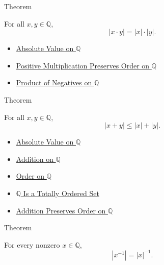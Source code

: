 \begin{theorembox}{Theorem}
\begin{theorem}
\label{thm:absolute-value-multiplicative-on-q}
For all $x,y\in\mathbb{Q}$,
\[
|x\cdot y|=|x|\cdot |y|.
\]
\end{theorem}
\end{theorembox}

\begin{dependencies}
\begin{itemize}
  \item \hyperref[def:absolute-value-on-q]{Absolute Value on $\mathbb{Q}$}
  \item \hyperref[thm:positive-multiplication-preserves-order-on-q]{Positive Multiplication Preserves Order on $\mathbb{Q}$}
  \item \hyperref[cor:product-of-negatives-on-q]{Product of Negatives on $\mathbb{Q}$}
\end{itemize}
\end{dependencies}

\begin{theorembox}{Theorem}
\begin{theorem}
\label{thm:triangle-inequality-on-q}
For all $x,y\in\mathbb{Q}$,
\[
|x+y|\le |x|+|y|.
\]
\end{theorem}
\end{theorembox}

\begin{dependencies}
\begin{itemize}
  \item \hyperref[def:absolute-value-on-q]{Absolute Value on $\mathbb{Q}$}
  \item \hyperref[def:addition-on-q-classes]{Addition on $\mathbb{Q}$}
  \item \hyperref[def:order-on-q]{Order on $\mathbb{Q}$}
  \item \hyperref[thm:q-totally-ordered-set]{$\mathbb{Q}$ Is a Totally Ordered Set}
  \item \hyperref[thm:addition-preserves-order-on-q]{Addition Preserves Order on $\mathbb{Q}$}
\end{itemize}
\end{dependencies}

\begin{theorembox}{Theorem}
\begin{theorem}
\label{thm:absolute-value-of-reciprocal-q}
For every nonzero $x\in\mathbb{Q}$,
\[
|x^{-1}|=|x|^{-1}.
\]
\end{theorem}
\end{theorembox}

